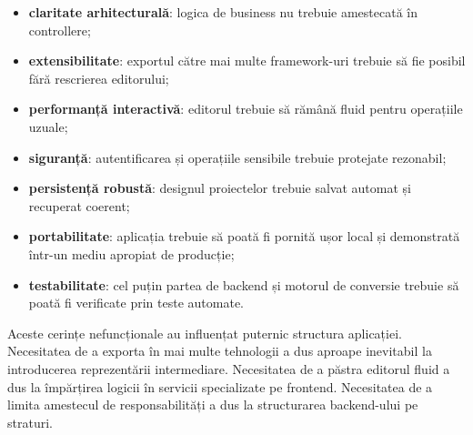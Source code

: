 \begin{itemize}[leftmargin=1.5cm]
  \item \textbf{claritate arhitecturală}: logica de business nu trebuie amestecată în controllere;
  \item \textbf{extensibilitate}: exportul către mai multe framework-uri trebuie să fie posibil fără rescrierea editorului;
  \item \textbf{performanță interactivă}: editorul trebuie să rămână fluid pentru operațiile uzuale;
  \item \textbf{siguranță}: autentificarea și operațiile sensibile trebuie protejate rezonabil;
  \item \textbf{persistență robustă}: designul proiectelor trebuie salvat automat și recuperat coerent;
  \item \textbf{portabilitate}: aplicația trebuie să poată fi pornită ușor local și demonstrată într-un mediu apropiat de producție;
  \item \textbf{testabilitate}: cel puțin partea de backend și motorul de conversie trebuie să poată fi verificate prin teste automate.
\end{itemize}

Aceste cerințe nefuncționale au influențat puternic structura aplicației. Necesitatea de a exporta în mai multe tehnologii a dus aproape inevitabil la introducerea reprezentării intermediare. Necesitatea de a păstra editorul fluid a dus la împărțirea logicii în servicii specializate pe frontend. Necesitatea de a limita amestecul de responsabilități a dus la structurarea backend-ului pe straturi.

